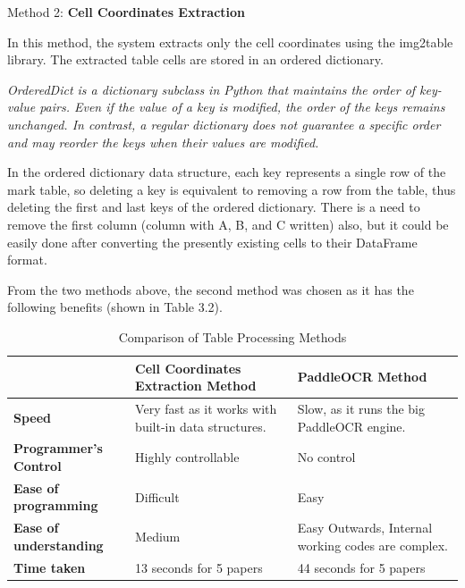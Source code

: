 
\noindent Method 2: \textbf{Cell Coordinates Extraction}

\vspace{1mm}

\noindent In this method, the system extracts only the cell coordinates using the img2table library. The extracted table cells are stored in an ordered dictionary.

\vspace{1mm}

\noindent \textit{OrderedDict is a dictionary subclass in Python that maintains the order of key-value pairs. Even if the value of a key is modified, the order of the keys remains unchanged. In contrast, a regular dictionary does not guarantee a specific order and may reorder the keys when their values are modified.}

\vspace{0.5mm}

\noindent In the ordered dictionary data structure, each key represents a single row of the mark table, so deleting a key is equivalent to removing a row from the table, thus deleting the first and last keys of the ordered dictionary. There is a  need to remove the first column (column with A, B, and C written) also, but it could be easily done after converting the presently existing cells to their DataFrame format.

\noindent From the two methods above, the second method was chosen as it has the following benefits (shown in Table 3.2).

\begin{table}[h!]
  \centering
  \renewcommand{\arraystretch}{1.2}
  \begin{tabular}{|l|p{4.5cm}|p{4.5cm}|}
      \hline
      \textbf{ } & \textbf{Cell Coordinates Extraction Method} & \textbf{PaddleOCR Method} \\
      \hline
      \textbf{Speed} & Very fast as it works with built-in data structures. & Slow, as it runs the big PaddleOCR engine. \\
      \hline
      \textbf{Programmer's Control} & Highly controllable & No control \\
      \hline
      \textbf{Ease of programming} & Difficult & Easy \\
      \hline
      \textbf{Ease of understanding} & Medium & Easy Outwards, Internal working codes are complex.\\
      \hline
      \textbf{Time taken} & 13 seconds for 5 papers & 44 seconds for 5 papers \\
      \hline
  \end{tabular}
  \caption{Comparison of Table Processing Methods}
\end{table}

